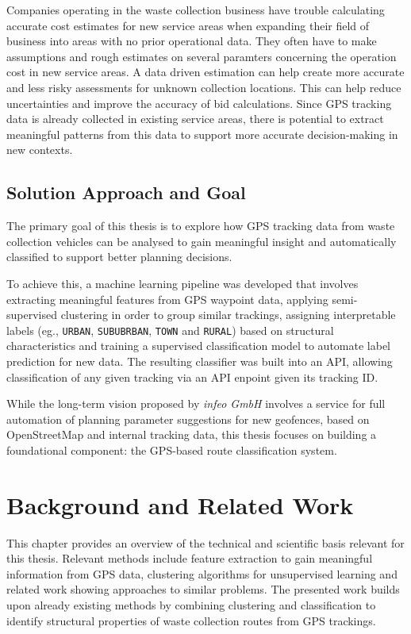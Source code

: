 \documentclass[a4paper,12pt,twoside]{scrreprt}
\begin{document}
Companies operating in the waste collection business have trouble calculating
accurate cost estimates for new service areas when expanding their field of
business into
areas with no prior operational data.
They
often have to make assumptions and rough estimates on several paramters
concerning the operation cost in new service areas. A data driven estimation
can help create more accurate and less risky assessments for unknown collection
locations. This can help reduce uncertainties and improve the accuracy of bid
calculations.
Since GPS tracking data is already collected in existing service
areas, there is potential to extract meaningful patterns from this data to
support more accurate decision-making in new contexts.

\section{Solution Approach and Goal}

The primary goal of this thesis is to explore how GPS tracking data from waste
collection vehicles can be analysed to gain meaningful insight and
automatically classified to support better planning decisions.

To achieve this, a machine learning pipeline was developed that
involves extracting meaningful features from GPS waypoint data, applying
semi-supervised clustering in order to group similar trackings, assigning
interpretable labels (eg., \texttt{URBAN}, \texttt{SUBUBRBAN}, \texttt{TOWN}
and
\texttt{RURAL}) based on structural characteristics and training a supervised
classification model to automate label prediction for new data.
The resulting classifier was built into an API, allowing classification of any
given tracking via an API enpoint given its tracking ID.

While the long-term vision proposed by \textit{infeo GmbH} involves a service
for full automation of planning parameter suggestions for new geofences, based
on OpenStreetMap and internal tracking data, this thesis focuses on building a
foundational component: the GPS-based route classification system.

\chapter{Background and Related Work}
This chapter provides an overview of the technical and scientific basis
relevant for this thesis.
Relevant methods include feature extraction to gain meaningful information
from GPS data, clustering algorithms for unsupervised learning and related work
showing approaches to similar problems. The presented work builds upon already
existing methods by combining
clustering and classification to identify structural properties of waste
collection routes from GPS trackings.
\end{document}
